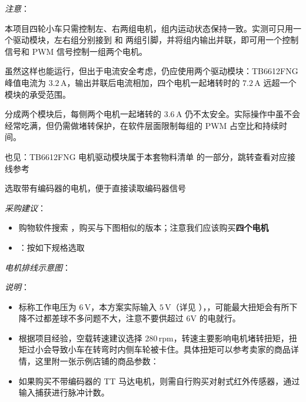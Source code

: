 \documentclass[11pt,a4paper]{article}
\begin{document}
\emph{注意}：

本项目四轮小车只需控制左、右两组电机，组内运动状态保持一致。实测可只用一个驱动模块，左右组分别接到  和  两组引脚，并将组内输出并联，即可用一个控制信号和 PWM 信号控制一组两个电机。

虽然这样也能运行，但出于电流安全考虑，仍应使用两个驱动模块：TB6612FNG 峰值电流为 $3.2\,\mathrm{A}$，输出并联后电流相加，四个电机一起堵转时的 $7.2\,\mathrm{A}$ 远超一个模块的承受范围。

分成两个模块后，每侧两个电机一起堵转的 $3.6\,\mathrm{A}$ 仍不太安全。实际操作中虽不会经常吃满，但仍需做堵转保护，在软件层面限制每组的 PWM 占空比和持续时间。

\begin{seealso}
  也见：TB6612FNG 电机驱动模块属于本套物料清单  的一部分，跳转查看对应接线参考
\end{seealso}

\label{pt:motor}

选取带有编码器的电机，便于直接读取编码器信号

\emph{采购建议}：

\begin{itemize}
  \item 购物软件搜索 ，购买与下图相似的版本；注意我们应该购买\textbf{四个电机}
  \item {}：按如下规格选取

\end{itemize}

\emph{电机排线示意图}：


\emph{说明}：

\begin{itemize}
  \item 标称工作电压为 $6\,\mathrm{V}$，本方案实际输入 $5\,\mathrm{V}$（详见 ），，可能最大扭矩会有所下降不过都差球不多问题不大，注意不要供超过 $6\mathrm{V}$ 的电就行。
  \item 根据项目经验，空载转速建议选择 $280\,\mathrm{rpm}$，转速主要影响电机堵转扭矩，扭矩过小会导致小车在转弯时内侧车轮被卡住。具体扭矩可以参考卖家的商品详情，这里附一张示例店铺的商品参数：

  
  \item 如果购买不带编码器的 TT 马达电机，则需自行购买对射式红外传感器，通过输入捕获进行脉冲计数。
\end{itemize}
\end{document}
